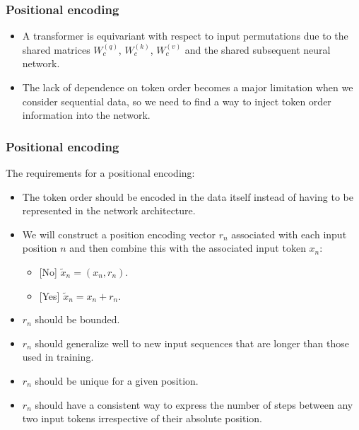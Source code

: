 \documentclass{beamer}
\begin{document}
\begin{frame}
    \frametitle{Positional encoding}
    \begin{itemize}
        \item A transformer is equivariant with respect to input permutations due to the shared matrices $W^{(q)}_{c}$, $W^{(k)}_{c}$, $W^{(v)}_{c}$ and the shared subsequent neural network.
        \item The lack of dependence on token order becomes a major limitation when we consider sequential data, so we need to find a way to inject token order information into the network.
    \end{itemize}
\end{frame}

\begin{frame}
    \frametitle{Positional encoding}
    The requirements for a positional encoding:
    \begin{itemize}
        \item The token order should be encoded in the data itself instead of having to be represented in the network architecture.
        \item We will construct a position encoding vector $r_{n}$ associated with each input position $n$ and then combine this with the associated input token $x_{n}$:
        \begin{itemize}
            \item {[No]} $\tilde{x}_{n}=(x_{n},r_{n})$.
            \item {[Yes]} $\tilde{x}_{n}=x_{n}+r_{n}$.
        \end{itemize}
        \item $r_{n}$ should be bounded.
        \item $r_{n}$ should generalize well to new input sequences that are longer than those used in training.
        \item $r_{n}$ should be unique for a given position.
        \item $r_{n}$ should have a consistent way to express the number of steps between any two input tokens irrespective of their absolute position.
    \end{itemize}
\end{frame}
\end{document}
